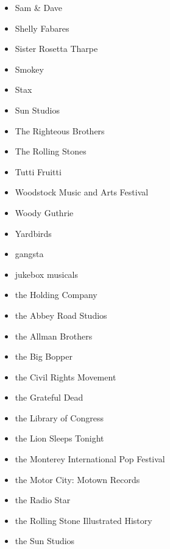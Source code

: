 \documentclass[12pt,a4paper]{article}
\begin{document}
\begin{itemize}
  \item Sam \& Dave
  \item Shelly Fabares
  \item Sister Rosetta Tharpe
  \item Smokey
  \item Stax
  \item Sun Studios
  \item The Righteous Brothers
  \item The Rolling Stones
  \item Tutti Fruitti
  \item Woodstock Music and Arts Festival
  \item Woody Guthrie
  \item Yardbirds
  \item gangsta
  \item jukebox musicals
  \item the Holding Company
  \item the Abbey Road Studios
  \item the Allman Brothers
  \item the Big Bopper
  \item the Civil Rights Movement
  \item the Grateful Dead
  \item the Library of Congress
  \item the Lion Sleeps Tonight
  \item the Monterey International Pop Festival
  \item the Motor City: Motown Records
  \item the Radio Star
  \item the Rolling Stone Illustrated History
  \item the Sun Studios
\end{itemize}
\end{document}
